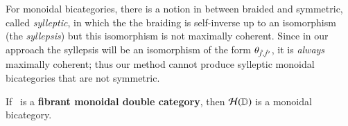 \documentclass{amsart}
\begin{document}
\begin{rmk}\label{rmk:sym}
  For monoidal bicategories, there is a notion in between braided and
  symmetric, called \emph{sylleptic}, in which the the braiding is
  self-inverse up to an isomorphism (the \emph{syllepsis}) but this
  isomorphism is not maximally coherent.  Since in our approach the
  syllepsis will be an isomorphism of the form
  $\theta_{\hat{f},\hat{f}'}$, it is \emph{always} maximally coherent;
  thus our method cannot produce sylleptic monoidal bicategories that
  are not symmetric.
\end{rmk}

\begin{lem}\label{thm:mon11-monbi}
  If \lD\ is a {\bf fibrant monoidal double category}, then $\mathcal{H}(\mathbb{D})$ is a
  monoidal bicategory.  
\end{lem}
\end{document}
